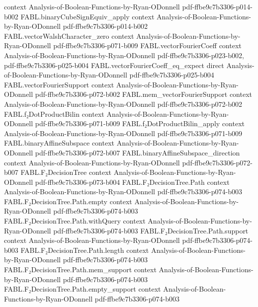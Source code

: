 \begin{theorem}
  {context}
  {Analysis-of-Boolean-Functions-by-Ryan-ODonnell}
  {pdf-ffbe9c7b3306-p014-b002}
\proofstep
  {FABL.binaryCubeSignEquiv_apply}
  {context}
  {Analysis-of-Boolean-Functions-by-Ryan-ODonnell}
  {pdf-ffbe9c7b3306-p014-b002}
\proofstep
  {FABL.vectorWalshCharacter_zero}
  {context}
  {Analysis-of-Boolean-Functions-by-Ryan-ODonnell}
  {pdf-ffbe9c7b3306-p071-b009}
\proofstep
  {FABL.vectorFourierCoeff}
  {context}
  {Analysis-of-Boolean-Functions-by-Ryan-ODonnell}
  {pdf-ffbe9c7b3306-p023-b002,
    pdf-ffbe9c7b3306-p025-b004}
\proofstep
  {FABL.vectorFourierCoeff_eq_expect}
  {direct}
  {Analysis-of-Boolean-Functions-by-Ryan-ODonnell}
  {pdf-ffbe9c7b3306-p025-b004}
\proofstep
  {FABL.vectorFourierSupport}
  {context}
  {Analysis-of-Boolean-Functions-by-Ryan-ODonnell}
  {pdf-ffbe9c7b3306-p072-b002}
\proofstep
  {FABL.mem_vectorFourierSupport}
  {context}
  {Analysis-of-Boolean-Functions-by-Ryan-ODonnell}
  {pdf-ffbe9c7b3306-p072-b002}
\proofstep
  {FABL.f₂DotProductBilin}
  {context}
  {Analysis-of-Boolean-Functions-by-Ryan-ODonnell}
  {pdf-ffbe9c7b3306-p071-b009}
\proofstep
  {FABL.f₂DotProductBilin_apply}
  {context}
  {Analysis-of-Boolean-Functions-by-Ryan-ODonnell}
  {pdf-ffbe9c7b3306-p071-b009}
\proofstep
  {FABL.binaryAffineSubspace}
  {context}
  {Analysis-of-Boolean-Functions-by-Ryan-ODonnell}
  {pdf-ffbe9c7b3306-p072-b007}
\proofstep
  {FABL.binaryAffineSubspace_direction}
  {context}
  {Analysis-of-Boolean-Functions-by-Ryan-ODonnell}
  {pdf-ffbe9c7b3306-p072-b007}
\proofstep
  {FABL.F₂DecisionTree}
  {context}
  {Analysis-of-Boolean-Functions-by-Ryan-ODonnell}
  {pdf-ffbe9c7b3306-p073-b004}
\proofstep
  {FABL.F₂DecisionTree.Path}
  {context}
  {Analysis-of-Boolean-Functions-by-Ryan-ODonnell}
  {pdf-ffbe9c7b3306-p074-b003}
\proofstep
  {FABL.F₂DecisionTree.Path.empty}
  {context}
  {Analysis-of-Boolean-Functions-by-Ryan-ODonnell}
  {pdf-ffbe9c7b3306-p074-b003}
\proofstep
  {FABL.F₂DecisionTree.Path.withQuery}
  {context}
  {Analysis-of-Boolean-Functions-by-Ryan-ODonnell}
  {pdf-ffbe9c7b3306-p074-b003}
\proofstep
  {FABL.F₂DecisionTree.Path.support}
  {context}
  {Analysis-of-Boolean-Functions-by-Ryan-ODonnell}
  {pdf-ffbe9c7b3306-p074-b003}
\proofstep
  {FABL.F₂DecisionTree.Path.length}
  {context}
  {Analysis-of-Boolean-Functions-by-Ryan-ODonnell}
  {pdf-ffbe9c7b3306-p074-b003}
\proofstep
  {FABL.F₂DecisionTree.Path.mem_support}
  {context}
  {Analysis-of-Boolean-Functions-by-Ryan-ODonnell}
  {pdf-ffbe9c7b3306-p074-b003}
\proofstep
  {FABL.F₂DecisionTree.Path.empty_support}
  {context}
  {Analysis-of-Boolean-Functions-by-Ryan-ODonnell}
  {pdf-ffbe9c7b3306-p074-b003}

\end{theorem}

